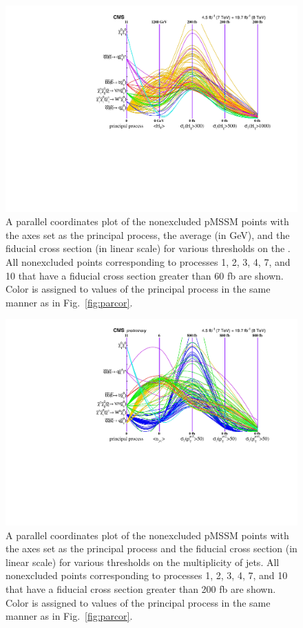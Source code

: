 \begin{figure}[h]
  \centering
         \includegraphics[width=1.0\textwidth]{figures/pMSSMpaper/parallel_coordinates/ParCorToposHT.pdf}
    \caption{A parallel coordinates plot of the nonexcluded pMSSM
      points with the axes set as the principal process, the average
      \HT{} (in GeV), and the 
    fiducial cross section (in linear scale) for various thresholds on the
    \HT{}. All nonexcluded points corresponding to processes 1, 2, 3,
    4, 7, and 10 that have a fiducial cross section greater than
    60 fb
    are shown. Color is assigned to
    values of the principal process in the same manner as in
    Fig.~\ref{fig:parcor}. }
    \label{fig:parcorHT}
\end{figure}
\begin{figure}[h]
  \centering
         \includegraphics[width=1.0\textwidth]{figures/pMSSMpaper/parallel_coordinates/ParCorToposJets.pdf}
    \caption{A parallel coordinates plot of the nonexcluded pMSSM
      points with the axes set as the principal process and the 
    fiducial cross section (in linear scale) for various thresholds on the
    multiplicity of jets. All nonexcluded points corresponding to processes 1, 2, 3,
    4, 7, and 10 that have a fiducial cross section greater than 200 fb are shown. Color is
    assigned to values of the principal process in the same manner as
    in Fig.~\ref{fig:parcor}. } 
    \label{fig:parcorNJets}
\end{figure}
